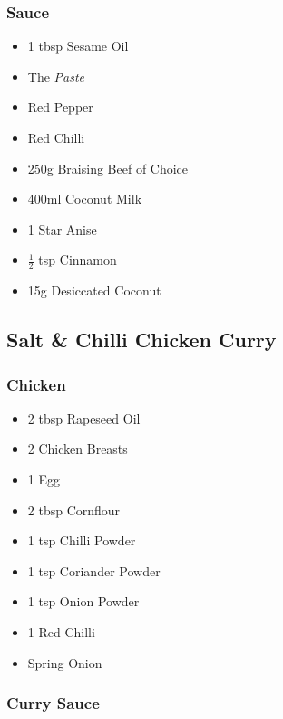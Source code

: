 \documentclass[11pt, english]{article}
\begin{document}
		\subsubsection*{Sauce}

	\begin{itemize}
        \setlength\itemsep{0cm}
                \item 1 tbsp Sesame Oil
                \item The \textit{Paste}
                \item Red Pepper
		\item Red Chilli
		\item 250g Braising Beef of Choice
                \item 400ml Coconut Milk
		\item 1 Star Anise
		\item $\frac{1}{2}$ tsp Cinnamon
		\item 15g Desiccated Coconut
        \end{itemize}

\newpage

	\subsection{Salt \& Chilli Chicken Curry}

		\subsubsection*{Chicken}

	\begin{itemize}
        \setlength\itemsep{0cm}
                \item 2 tbsp Rapeseed Oil
		\item 2 Chicken Breasts
		\item 1 Egg
		\item 2 tbsp Cornflour
		\item 1 tsp Chilli Powder
		\item 1 tsp Coriander Powder
		\item 1 tsp Onion Powder
		\item 1 Red Chilli
		\item Spring Onion
        \end{itemize}

		\subsubsection*{Curry Sauce}
\end{document}
